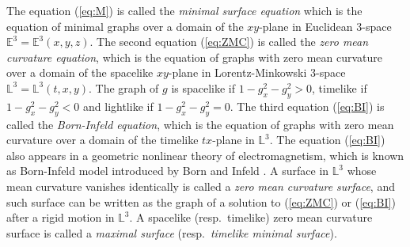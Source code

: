 \documentclass[12pt,amstex]{amsart}%
\theoremstyle{plain} %
\theoremstyle{definition}
\begin{document}
The equation (\ref{eq:M}) is called the {\it minimal surface equation} which is the equation of minimal graphs over a domain of the $xy$-plane in Euclidean 3-space $\mathbb{E}^3=\mathbb{E}^3(x,y,z)$. The second equation (\ref{eq:ZMC}) is called the {\it zero mean curvature equation}, which is the equation of graphs with zero mean curvature over a domain of the spacelike $xy$-plane in Lorentz-Minkowski 3-space $\mathbb{L}^3=\mathbb{L}^3(t,x,y)$. The graph of $g$ is spacelike if $1-g_x^2-g_y^2>0$, timelike if $1-g_x^2-g_y^2<0$ and lightlike if $1-g_x^2-g_y^2=0$. The third equation (\ref{eq:BI}) is called the {\it Born-Infeld equation}, which is the equation of graphs with zero mean curvature over a domain of the timelike $tx$-plane in $\mathbb{L}^3$. The equation (\ref{eq:BI}) also appears in a geometric nonlinear theory of electromagnetism, which is known as Born-Infeld model introduced by Born and Infeld \cite{BI}. A surface in $\mathbb{L}^3$ whose mean curvature vanishes identically is called a {\it zero mean curvature surface}, and such surface can be written as the graph of a solution to (\ref{eq:ZMC}) or (\ref{eq:BI}) after a rigid motion in $\mathbb{L}^3$. A spacelike (resp.\ timelike) zero mean curvature surface is called a {\it maximal surface} (resp.\ {\it timelike minimal surface}).
\end{document}
